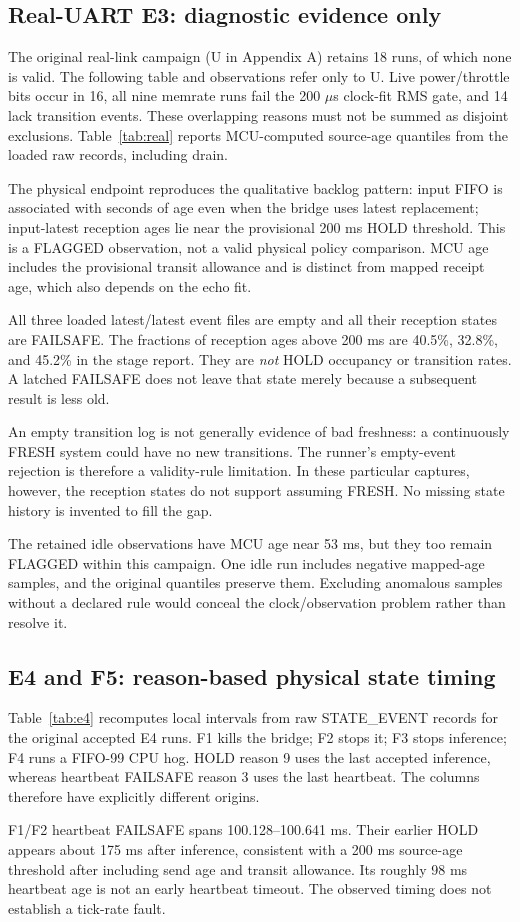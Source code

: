 \documentclass[a4paper,11pt]{article}
\newcommand{\page}{\clearpage}
\begin{document}
\subsection{Real-UART E3: diagnostic evidence only}
The original real-link campaign (U in Appendix A) retains 18 runs, of which none is valid. The following table and observations refer only to U. Live power/throttle bits occur in 16, all nine memrate runs fail the 200 $\mu$s clock-fit RMS gate, and 14 lack transition events. These overlapping reasons must not be summed as disjoint exclusions. Table~\ref{tab:real} reports MCU-computed source-age quantiles from the loaded raw records, including drain.

The physical endpoint reproduces the qualitative backlog pattern: input FIFO is associated with seconds of age even when the bridge uses latest replacement; input-latest reception ages lie near the provisional 200 ms HOLD threshold. This is a FLAGGED observation, not a valid physical policy comparison. MCU age includes the provisional transit allowance and is distinct from mapped receipt age, which also depends on the echo fit.

All three loaded latest/latest event files are empty and all their reception states are FAILSAFE. The fractions of reception ages above 200 ms are 40.5\%, 32.8\%, and 45.2\% in the stage report. They are \emph{not} HOLD occupancy or transition rates. A latched FAILSAFE does not leave that state merely because a subsequent result is less old.

An empty transition log is not generally evidence of bad freshness: a continuously FRESH system could have no new transitions. The runner's empty-event rejection is therefore a validity-rule limitation. In these particular captures, however, the reception states do not support assuming FRESH. No missing state history is invented to fill the gap.

The retained idle observations have MCU age near 53 ms, but they too remain FLAGGED within this campaign. One idle run includes negative mapped-age samples, and the original quantiles preserve them. Excluding anomalous samples without a declared rule would conceal the clock/observation problem rather than resolve it.


\page
\subsection{E4 and F5: reason-based physical state timing}
Table~\ref{tab:e4} recomputes local intervals from raw STATE\_EVENT records for the original accepted E4 runs. F1 kills the bridge; F2 stops it; F3 stops inference; F4 runs a FIFO-99 CPU hog. HOLD reason 9 uses the last accepted inference, whereas heartbeat FAILSAFE reason 3 uses the last heartbeat. The columns therefore have explicitly different origins.

F1/F2 heartbeat FAILSAFE spans 100.128--100.641 ms. Their earlier HOLD appears about 175 ms after inference, consistent with a 200 ms source-age threshold after including send age and transit allowance. Its roughly 98 ms heartbeat age is not an early heartbeat timeout. The observed timing does not establish a tick-rate fault.
\end{document}
